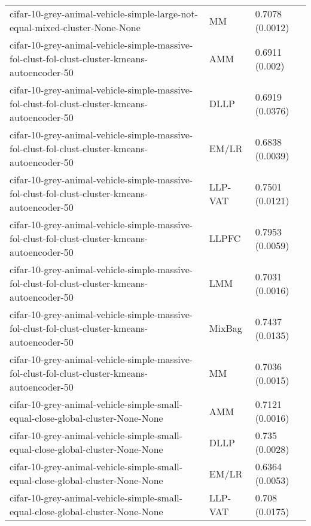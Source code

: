 \begin{longtable}{lll}
                                  cifar-10-grey-animal-vehicle-simple-large-not-equal-mixed-cluster-None-None &        MM &                           0.7078 (0.0012) \\
                cifar-10-grey-animal-vehicle-simple-massive-fol-clust-fol-clust-cluster-kmeans-autoencoder-50 &       AMM &                            0.6911 (0.002) \\
                cifar-10-grey-animal-vehicle-simple-massive-fol-clust-fol-clust-cluster-kmeans-autoencoder-50 &      DLLP &                           0.6919 (0.0376) \\
                cifar-10-grey-animal-vehicle-simple-massive-fol-clust-fol-clust-cluster-kmeans-autoencoder-50 &     EM/LR &                           0.6838 (0.0039) \\
                cifar-10-grey-animal-vehicle-simple-massive-fol-clust-fol-clust-cluster-kmeans-autoencoder-50 &   LLP-VAT &                           0.7501 (0.0121) \\
                cifar-10-grey-animal-vehicle-simple-massive-fol-clust-fol-clust-cluster-kmeans-autoencoder-50 &     LLPFC &                           0.7953 (0.0059) \\
                cifar-10-grey-animal-vehicle-simple-massive-fol-clust-fol-clust-cluster-kmeans-autoencoder-50 &       LMM &                           0.7031 (0.0016) \\
                cifar-10-grey-animal-vehicle-simple-massive-fol-clust-fol-clust-cluster-kmeans-autoencoder-50 &    MixBag &                           0.7437 (0.0135) \\
                cifar-10-grey-animal-vehicle-simple-massive-fol-clust-fol-clust-cluster-kmeans-autoencoder-50 &        MM &                           0.7036 (0.0015) \\
                               cifar-10-grey-animal-vehicle-simple-small-equal-close-global-cluster-None-None &       AMM &                           0.7121 (0.0016) \\
                               cifar-10-grey-animal-vehicle-simple-small-equal-close-global-cluster-None-None &      DLLP &                            0.735 (0.0028) \\
                               cifar-10-grey-animal-vehicle-simple-small-equal-close-global-cluster-None-None &     EM/LR &                           0.6364 (0.0053) \\
                               cifar-10-grey-animal-vehicle-simple-small-equal-close-global-cluster-None-None &   LLP-VAT &                            0.708 (0.0175) \\

\end{longtable}
